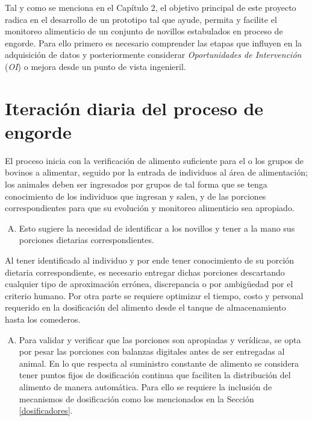 



Tal y como se menciona en el Capítulo 2, el objetivo principal de este proyecto radica en el desarrollo de un prototipo tal que ayude, permita y facilite el monitoreo alimenticio de un conjunto de novillos estabulados en proceso de engorde. Para ello primero es necesario comprender las etapas que influyen en la adquisición de datos y posteriormente considerar \textit{Oportunidades de Intervención} (\textit{OI}) o mejora desde un punto de vista ingenieril.\\

\section{Iteración diaria del proceso de engorde}

El proceso inicia con la verificación de alimento suficiente para el o los grupos de bovinos a alimentar, seguido por la entrada de individuos al área de alimentación; los animales deben ser ingresados por grupos de tal forma que se tenga conocimiento de los individuos que ingresan y salen, y de las porciones correspondientes para que su evolución y monitoreo alimenticio sea apropiado.

\begin{enumerate}[O.I \#1:]
    \item Esto sugiere la necesidad de identificar a los novillos y tener a la mano sus porciones dietarias correspondientes. \label{OI1}
\end{enumerate}

Al tener identificado al individuo y por ende tener conocimiento de su porción dietaria correspondiente, es necesario entregar dichas porciones descartando cualquier tipo de aproximación errónea, discrepancia o por ambigüedad por el criterio humano. Por otra parte se requiere optimizar el tiempo, costo y personal requerido en la dosificación del alimento desde el tanque de almacenamiento hasta los comederos.

\begin{enumerate}[O.I \#2:]
    \item Para validar y verificar que las porciones son apropiadas y  verídicas, se opta por pesar las porciones con balanzas digitales antes de ser entregadas al animal. En lo que respecta al suministro constante de alimento se considera tener puntos fijos de dosificación continua que faciliten la distribución del alimento de manera automática. Para ello se requiere la inclusión de mecanismos de dosificación como los mencionados en la Sección \ref{dosificadores}. \label{OI2}
\end{enumerate}


